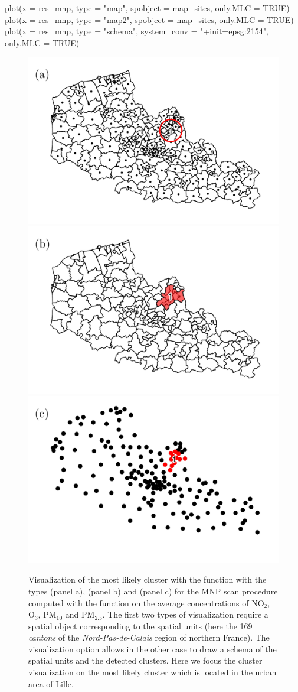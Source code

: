 \begin{example}
 plot(x = res_mnp, type = "map", spobject = map_sites, only.MLC = TRUE)
 plot(x = res_mnp, type = "map2", spobject = map_sites, only.MLC = TRUE)
 plot(x = res_mnp, type = "schema", system_conv = "+init=epsg:2154", only.MLC = TRUE)
\end{example}

\begin{figure}[htbp]
\centering
\includegraphics[width = 0.49\linewidth]{MLC_MNP_circle1.pdf}
\includegraphics[width = 0.49\linewidth]{MLC_MNP1.pdf}
\includegraphics[width = 0.49\linewidth]{MLC_MNP_schema1.pdf}
\caption{Visualization of the most likely cluster with the function  with the types  (panel a),  (panel b) and  (panel c) for the MNP scan procedure computed with the function  on the average concentrations of $\text{NO}_2$, $\text{O}_3$, $\text{PM}_{10}$ and $\text{PM}_{2.5}$. The first two types of visualization require a spatial object corresponding to the spatial units (here the 169 \textit{cantons} of the \textit{Nord-Pas-de-Calais} region of northern France). The visualization option  allows in the other case to draw a schema of the spatial units and the detected clusters. Here we focus the cluster visualization on the most likely cluster which is located in the urban area of Lille.}
\label{fig:mlc_mnp}
\end{figure}

